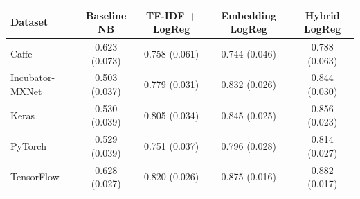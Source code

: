 \begin{tabular}{lcccc}
\toprule
Dataset & Baseline NB & TF-IDF + LogReg & Embedding LogReg & Hybrid LogReg \\
\midrule
Caffe & 0.623 (0.073) & 0.758 (0.061) & 0.744 (0.046) & 0.788 (0.063) \\
Incubator-MXNet & 0.503 (0.037) & 0.779 (0.031) & 0.832 (0.026) & 0.844 (0.030) \\
Keras & 0.530 (0.039) & 0.805 (0.034) & 0.845 (0.025) & 0.856 (0.023) \\
PyTorch & 0.529 (0.039) & 0.751 (0.037) & 0.796 (0.028) & 0.814 (0.027) \\
TensorFlow & 0.628 (0.027) & 0.820 (0.026) & 0.875 (0.016) & 0.882 (0.017) \\
\bottomrule
\end{tabular}